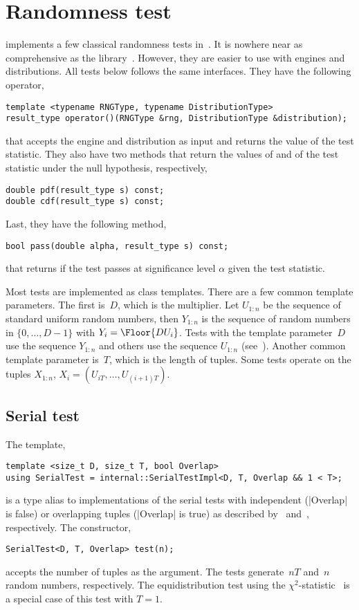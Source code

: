 \section{Randomness test}
\label{sec:Randomness tests}

\mckl implements a few classical randomness tests in~\cite{Knuth:1997us}. It is
nowhere near as comprehensive as the \testu library~\cite{Lecuyer:2007hv}.
However, they are easier to use with \cpp \rng engines and distributions. All
tests below follows the same interfaces. They have the following operator,
\begin{verbatim}
template <typename RNGType, typename DistributionType>
result_type operator()(RNGType &rng, DistributionType &distribution);
\end{verbatim}
that accepts the \rng engine and distribution as input and returns the value of
the test statistic. They also have two methods that return the values of \pdf
and \cdf of the test statistic under the null hypothesis, respectively,
\begin{verbatim}
double pdf(result_type s) const;
double cdf(result_type s) const;
\end{verbatim}
Last, they have the following method,
\begin{verbatim}
bool pass(double alpha, result_type s) const;
\end{verbatim}
that returns if the test passes at significance level $\alpha$ given the test
statistic.

Most tests are implemented as class templates. There are a few common template
parameters. The first is~$D$, which is the multiplier. Let $U_{1:n}$ be the
sequence of standard uniform random numbers, then $Y_{1:n}$ is the sequence of
random numbers in $\{0,\dots,D - 1\}$ with $Y_i = \Floor{DU_i}$. Tests with the
template parameter~$D$ use the sequence $Y_{1:n}$ and others use the sequence
$U_{1:n}$ (see~\cite[pp.~61]{Knuth:1997us}). Another common template parameter
is~$T$, which is the length of tuples. Some tests operate on the tuples
$X_{1:n}$, $X_i = (U_{iT},\dots,U_{(i+1)T})$.

\subsection{Serial test}
\label{sub:Serial test}

The template,
\begin{verbatim}
template <size_t D, size_t T, bool Overlap>
using SerialTest = internal::SerialTestImpl<D, T, Overlap && 1 < T>;
\end{verbatim}
is a type alias to implementations of the serial tests with independent
(|Overlap| is false) or overlapping tuples (|Overlap| is true) as described
by~\cite[pp.~62]{Knuth:1997us} and~\cite[ex.~24, pp.~78]{Knuth:1997us},
respectively. The constructor,
\begin{verbatim}
SerialTest<D, T, Overlap> test(n);
\end{verbatim}
accepts the number of tuples as the argument. The tests generate~$nT$ and~$n$
random numbers, respectively. The equidistribution test using the
$\chi^2$-statistic~\cite[pp.~61]{Knuth:1997us} is a special case of this test
with $T = 1$.

